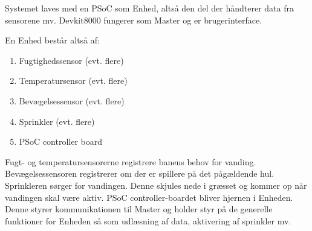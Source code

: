 Systemet laves med en PSoC som Enhed, altså den del der håndterer data fra sensorene mv.
Devkit8000 fungerer som Master og er brugerinterface.

En Enhed består altså af:
\begin{enumerate}
\item Fugtighedssensor (evt. flere)
\item Temperatursensor (evt. flere)
\item Bevægelsessensor (evt. flere)
\item Sprinkler (evt. flere)
\item PSoC controller board
\end{enumerate}

Fugt- og temperatursensorerne registrere banens behov for vanding. Bevægelsessensoren registrerer om der er spillere på det pågældende hul. Sprinkleren sørger for vandingen. Denne skjules nede i græsset og kommer op når vandingen skal være aktiv.
PSoC controller-boardet bliver hjernen i Enheden. Denne styrer kommunikationen til Master og holder styr på de generelle funktioner for Enheden så som udlæsning af data, aktivering af sprinkler mv.